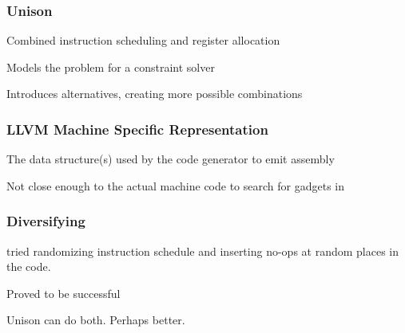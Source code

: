 \begin{frame}
	\frametitle{Unison}
	
	Combined instruction scheduling and register allocation

	\vspace{0.5cm}

	Models the problem for a constraint solver \cite{unison-docs}

	\vspace{0.5cm}

	Introduces alternatives, creating more possible combinations

\end{frame}

\begin{frame}
	\frametitle{LLVM Machine Specific Representation}
	
	The data structure(s) used by the code generator to emit assembly \cite{llvm-mir-lang-ref}

	\vspace{0.5cm}

	Not close enough to the actual machine code to search for gadgets in
	
\end{frame}

\begin{frame}
	\frametitle{Diversifying}

	\textcite{large-scale-automated} tried randomizing instruction schedule and inserting no-ops at random places in the code.

	\vspace{0.5cm}

	Proved to be successful

	\vspace{0.5cm}

	Unison can do both. Perhaps better.

\end{frame}
